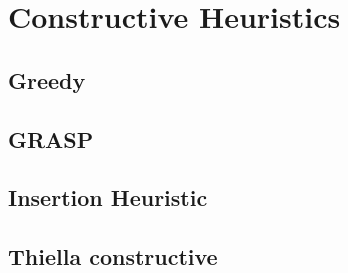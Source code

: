 \chapter{Constructive Heuristics}

\section{Greedy}
\section{GRASP}
\section{Insertion Heuristic}
\section{Thiella constructive}
